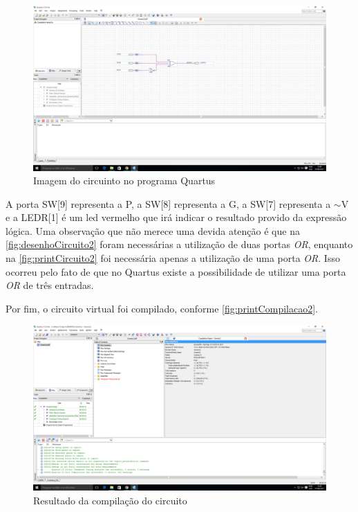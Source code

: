 \begin{figure}[htb]
    \centering
	\caption{\label{fig:printCircuito2}Imagem do circuinto no programa Quartus}
	\includegraphics[width=1\textwidth]{img/cenario2/printCircuito}
\end{figure}

A porta SW[9] representa a P, a SW[8] representa a G, a SW[7]
 representa a $\sim$V e a LEDR[1] é um led vermelho que irá
 indicar o resultado provido da expressão lógica. Uma observação que não merece uma devida atenção é que
 na \autoref{fig:desenhoCircuito2} foram necessárias a utilização de duas portas \textit{OR}, enquanto na
 \autoref{fig:printCircuito2} foi necessária apenas a utilização de uma porta \textit{OR}. Isso ocorreu pelo fato
 de que no Quartus existe a possibilidade de utilizar uma porta \textit{OR} de três entradas.

Por fim, o circuito virtual foi compilado, conforme \autoref{fig:printCompilacao2}.

\begin{figure}[htb]
    \centering
	\caption{\label{fig:printCompilacao2}Resultado da compilação do circuito}
	\includegraphics[width=1\textwidth]{img/cenario2/printCompilacao}
\end{figure}





